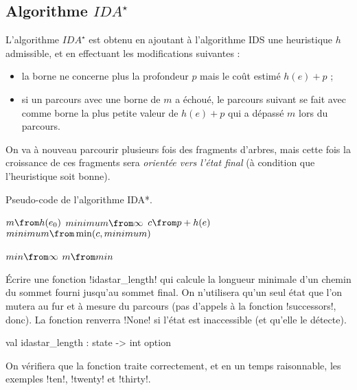 \subsection{Algorithme $IDA^{\star}$}

L'algorithme $IDA^{\star}$ est obtenu en ajoutant à l'algorithme
\textsc{IDS} une heuristique $h$ admissible, et en effectuant
les modifications suivantes :
\begin{itemize}
  \item la borne ne concerne plus la profondeur $p$ mais le coût
        estimé $h(e) + p$ ;
  \item si un parcours avec une borne de $m$ a échoué, le parcours
        suivant se fait avec comme borne la plus petite valeur
        de $h(e) + p$ qui a dépassé $m$ lors du parcours.
\end{itemize}
On va à nouveau parcourir plusieurs fois des fragments d'arbres, mais
cette fois la croissance de ces fragments sera \emph{orientée vers l'état
  final} (à condition que l'heuristique soit bonne).

\begin{algorithm}
  \caption{Pseudo-code de l'algorithme IDA*.}\label{fig:IDA*}
  \begin{algorithmic}
      \State $m \from h(e_0)$
      \State $minimum \from \infty$
        \State $c \from p + h(e)$
        \State $minimum \from \min(c, minimum)$
        \State {}
      \EndIf
        \State {}
      \EndIf
          \State {}
        \EndIf
      \EndFor
      \State {}
    \EndFunction

        \State $min \from \infty$
          \State {}
        \EndIf
        \State $m \from min$
      \EndWhile
      \State {}
    \EndFunction
  \end{algorithmic}
\end{algorithm}

\begin{ques}
  Écrire une fonction \ml!idastar_length! qui calcule la longueur
  minimale d'un chemin du sommet fourni jusqu'au sommet final.
  On n'utilisera qu'un seul état que l'on mutera au fur et à mesure
  du parcours (pas d'appels à la fonction \ml!successors!, donc).
  La fonction renverra \ml!None! si l'état est inaccessible
  (et qu'elle le détecte).
\begin{ocaml}
val idastar_length : state -> int option
\end{ocaml}
  \begin{rem}
    On vérifiera que la fonction traite correctement, et en un temps
    raisonnable, les exemples \ml!ten!, \ml!twenty! et \ml!thirty!.
  \end{rem}
\end{ques}


